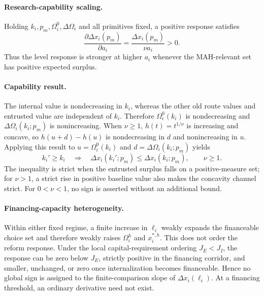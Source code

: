 \paragraph{Research-capability scaling.}
Holding \(k_i,p_m,\Omega_i^0,\Delta\Omega_i\) and all primitives fixed, a
positive response satisfies
\begin{equation}
  \frac{\partial\Delta x_i(p_m)}{\partial a_i}
  =
  \frac{\Delta x_i(p_m)}{\nu a_i}
  >0.
  \label{eq:p08-capability-response}
\end{equation}
Thus the level response is stronger at higher \(a_i\) whenever the
MAH-relevant set has positive expected surplus.

\paragraph{Capability result.}
The internal value is nondecreasing in \(k_i\), whereas the other old route
values and entrusted value are independent of \(k_i\). Therefore
\(\Omega_i^0(k_i)\) is nondecreasing and
\(\Delta\Omega_i(k_i;p_m)\) is nonincreasing. When \(\nu\geq1\),
\(h(t)=t^{1/\nu}\) is increasing and concave, so
\(h(u+d)-h(u)\) is nondecreasing in \(d\) and nonincreasing in \(u\).
Applying this result to \(u=\Omega_i^0(k_i)\) and
\(d=\Delta\Omega_i(k_i;p_m)\) yields
\begin{equation}
  k_i'\geq k_i
  \quad\Longrightarrow\quad
  \Delta x_i(k_i';p_m)
  \leq
  \Delta x_i(k_i;p_m),
  \qquad \nu\geq1.
  \label{eq:p08-manufacturing-response}
\end{equation}
The inequality is strict when the entrusted surplus falls on a
positive-measure set; for \(\nu>1\), a strict rise in positive baseline value
also makes the concavity channel strict. For \(0<\nu<1\), no sign is asserted
without an additional bound.

\paragraph{Financing-capacity heterogeneity.}
Within either fixed regime, a finite increase in \(\ell_i\) weakly expands the
financeable choice set and therefore weakly raises \(\Omega_i^h\) and
\(x_i^{*,h}\). This does not order the reform response. Under the local
capital-requirement ordering \(J_E<J_I\), the response can be zero below
\(J_E\), strictly positive in the financing corridor, and smaller, unchanged,
or zero once internalization becomes financeable. Hence no global sign is
assigned to the finite-comparison slope of \(\Delta x_i(\ell_i)\). At a
financing threshold, an ordinary derivative need not exist.

